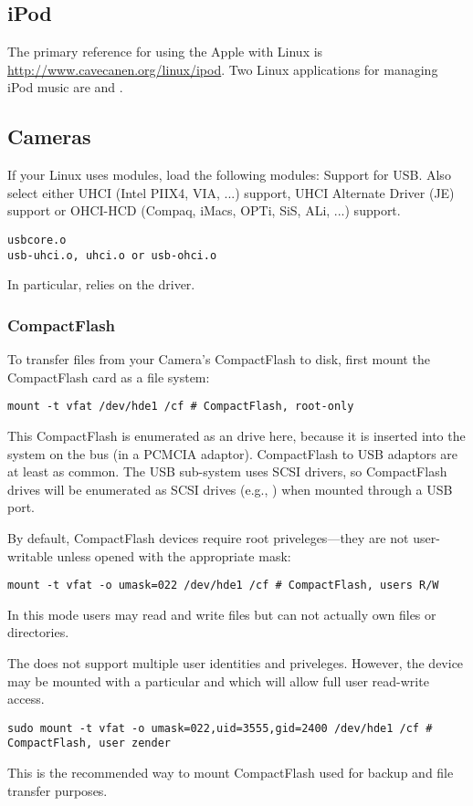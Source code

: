 \documentclass[12pt,twoside]{article}
\begin{document}
\subsection{iPod}\label{sxn:ipod}
The primary reference for using the Apple  with Linux is 
\url{http://www.cavecanen.org/linux/ipod}.
Two Linux applications for managing iPod music are  and 
.

\subsection{Cameras}\label{sxn:cmr}
If your Linux uses modules, load the following modules:
Support for USB. Also select either UHCI (Intel PIIX4, VIA, ...)
support, UHCI Alternate Driver (JE) support or OHCI-HCD (Compaq,
iMacs, OPTi, SiS, ALi, ...) support.  
\begin{verbatim}
usbcore.o
usb-uhci.o, uhci.o or usb-ohci.o
\end{verbatim}
In particular,  relies on the 
driver. 

\subsubsection{CompactFlash}\label{sxn:cf}
To transfer files from your Camera's CompactFlash to disk, first
mount the CompactFlash card as a  file system:
\begin{verbatim}
mount -t vfat /dev/hde1 /cf # CompactFlash, root-only
\end{verbatim}
This CompactFlash is enumerated as an  drive here, because
it is inserted into the system on the  bus (in a PCMCIA
adaptor).
CompactFlash to USB adaptors are at least as common.
The USB sub-system uses SCSI drivers, so CompactFlash drives will be
enumerated as SCSI drives (e.g., ) when mounted
through a USB port.

By default, CompactFlash devices require root priveleges---they are
not user-writable unless opened with the appropriate mask:
\begin{verbatim}
mount -t vfat -o umask=022 /dev/hde1 /cf # CompactFlash, users R/W
\end{verbatim}
In this mode users may read and write files but can not actually
own files or directories.

The   does not support multiple user
identities and priveleges.
However, the device may be mounted with a particular  and
 which will allow full user read-write access.
\begin{verbatim}
sudo mount -t vfat -o umask=022,uid=3555,gid=2400 /dev/hde1 /cf # CompactFlash, user zender
\end{verbatim}
This is the recommended way to mount CompactFlash used for backup
and file transfer purposes. 
\end{document}
